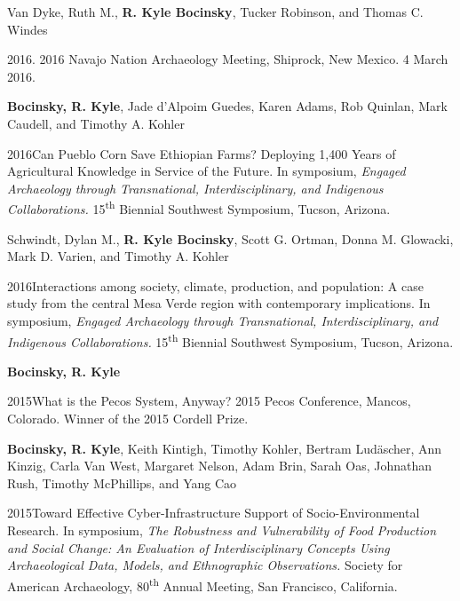 Van Dyke, Ruth M., {\bf R. Kyle Bocinsky}, Tucker Robinson, and Thomas C. Windes
\begin{list1}
\item[] 2016\hspace{.2cm}{Great houses, shrines, and high places: Intervisibility across the Chacoan World}. 2016 Navajo Nation Archaeology Meeting, Shiprock, New Mexico. 4 March 2016.
\end{list1}

{\bf Bocinsky, R. Kyle}, Jade d'Alpoim Guedes, Karen Adams, Rob Quinlan, Mark Caudell, and Timothy A. Kohler
\nopagebreak
\begin{list1}
\item[] 2016\hspace{.2cm}Can Pueblo Corn Save Ethiopian Farms?  Deploying 1,400 Years of Agricultural Knowledge in Service of the Future.  In symposium, \emph{Engaged Archaeology through Transnational, Interdisciplinary, and Indigenous Collaborations.}
15\textsuperscript{th} Biennial Southwest Symposium, Tucson, Arizona.
\end{list1}

Schwindt, Dylan M., {\bf R. Kyle Bocinsky}, Scott G. Ortman, Donna M. Glowacki, Mark D. Varien, and Timothy A. Kohler
\nopagebreak
\begin{list1}
\item[] 2016\hspace{.2cm}Interactions among society, climate, production, and population: A case study from the central Mesa Verde region with contemporary implications. In symposium, \emph{Engaged Archaeology through Transnational, Interdisciplinary, and Indigenous Collaborations.}
15\textsuperscript{th} Biennial Southwest Symposium, Tucson, Arizona.
\end{list1}

{\bf Bocinsky, R. Kyle}
\nopagebreak
\begin{list1}
\item[] 2015\hspace{.2cm}What is the Pecos System, Anyway? 2015 Pecos Conference, Mancos, Colorado. Winner of the 2015 Cordell Prize.
\end{list1}


{\bf Bocinsky, R. Kyle}, Keith Kintigh, Timothy Kohler, Bertram Lud\"ascher, Ann Kinzig, Carla Van West, Margaret Nelson, Adam Brin, Sarah Oas, Johnathan Rush, Timothy McPhillips, and Yang Cao
\nopagebreak
\begin{list1}
\item[] 2015\hspace{.2cm}Toward Effective Cyber-Infrastructure Support of Socio-Environmental Research. In symposium, \emph{The Robustness and Vulnerability of Food Production and Social Change: An Evaluation of Interdisciplinary Concepts Using Archaeological Data, Models, and Ethnographic Observations.} Society for American Archaeology, 80\textsuperscript{th} Annual Meeting, San Francisco, California.
\end{list1}


